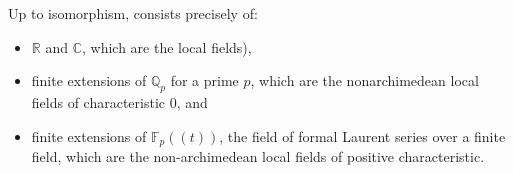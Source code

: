 \begin{theorem} \label{theorem:classification_of_local_fields}
Up to isomorphism,  consists precisely of:
\begin{itemize}
    \item $\mathbb{R}$ and $\mathbb{C}$, which are the  local fields),
    \item finite extensions of $\mathbb{Q}_p$ for a prime $p$, which are the nonarchimedean local fields of characteristic $0$, and
    \item finite extensions of $\mathbb{F}_p((t))$, the field of formal Laurent series over a finite field, which are the non-archimedean local fields of positive characteristic.
\end{itemize}
\end{theorem}
